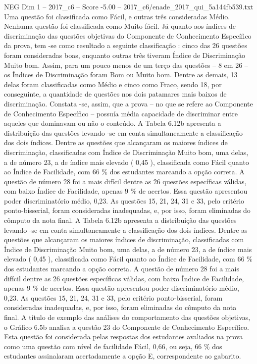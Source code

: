 \begin{textsample}{NEG Dim 1 – 2017\_c6 – Score -5.00 – 2017\_c6/enade\_2017\_qui\_5a144fb539.txt}
Uma questão foi classificada como Fácil, e outras três consideradas Médio.
Nenhuma questão foi classificada como Muito fácil.
Já quanto aos índices de discriminação das questões objetivas do Componente de Conhecimento Específico da prova, tem -se como resultado a seguinte classificação : cinco das 26 questões foram consideradas boas, enquanto outras três tiveram Índice de Discriminação Muito bom.
Assim, para um pouco menos de um terço das questões – 8 em 26 – os Índices de Discriminação foram Bom ou Muito bom.
Dentre as demais, 13 delas foram classificadas como Médio e cinco como Fraco, sendo 18, por conseguinte, a quantidade de questões nos dois patamares mais baixos de discriminação.
Constata -se, assim, que a prova – no que se refere ao Componente de Conhecimento Específico – possuía média capacidade de discriminar entre aqueles que dominavam ou não o conteúdo.
A Tabela 6.12b apresenta a distribuição das questões levando -se em conta simultaneamente a classificação dos dois índices.
Dentre as questões que alcançaram os maiores índices de discriminação, classificadas com Índice de Discriminação Muito bom, uma delas, a de número 23, a de índice mais elevado ( 0,45 ), classificada como Fácil quanto ao Índice de Facilidade, com 66 \% dos estudantes marcando a opção correta.
A questão de número 28 foi a mais difícil dentre as 26 questões específicas válidas, com baixo Índice de Facilidade, apenas 9 \% de acertos.
Essa questão apresentou poder discriminatório médio, 0,23.
As questões 15, 21, 24, 31 e 33, pelo critério ponto-bisserial, foram consideradas inadequadas, e, por isso, foram eliminadas do cômputo da nota final.
A Tabela 6.12b apresenta a distribuição das questões levando -se em conta simultaneamente a classificação dos dois índices.
Dentre as questões que alcançaram os maiores índices de discriminação, classificadas com Índice de Discriminação Muito bom, uma delas, a de número 23, a de índice mais elevado ( 0,45 ), classificada como Fácil quanto ao Índice de Facilidade, com 66 \% dos estudantes marcando a opção correta.
A questão de número 28 foi a mais difícil dentre as 26 questões específicas válidas, com baixo Índice de Facilidade, apenas 9 \% de acertos.
Essa questão apresentou poder discriminatório médio, 0,23.
As questões 15, 21, 24, 31 e 33, pelo critério ponto-bisserial, foram consideradas inadequadas, e, por isso, foram eliminadas do cômputo da nota final.
A título de exemplo das análises do comportamento das questões objetivas, o Gráfico 6.5b analisa a questão 23 do Componente de Conhecimento Específico.
Esta questão foi considerada pelas respostas dos estudantes avaliados na prova como uma questão com nível de facilidade Fácil, 0,66, ou seja, 66 \% dos estudantes assinalaram acertadamente a opção E, correspondente ao gabarito.

\end{textsample}
